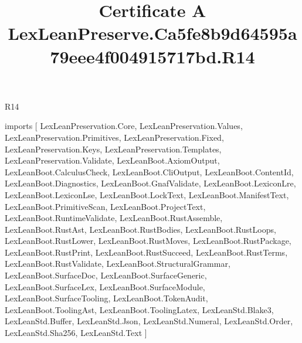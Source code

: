 \begin{lexlean}{R14}
\title{Certificate A LexLeanPreserve.Ca5fe8b9d64595a79eee4f004915717bd.R14}
\begin{coremodule}
imports [
  LexLeanPreservation.Core,
  LexLeanPreservation.Values,
  LexLeanPreservation.Primitives,
  LexLeanPreservation.Fixed,
  LexLeanPreservation.Keys,
  LexLeanPreservation.Templates,
  LexLeanPreservation.Validate,
  LexLeanBoot.AxiomOutput,
  LexLeanBoot.CalculusCheck,
  LexLeanBoot.CliOutput,
  LexLeanBoot.ContentId,
  LexLeanBoot.Diagnostics,
  LexLeanBoot.GnafValidate,
  LexLeanBoot.LexiconLre,
  LexLeanBoot.LexiconLse,
  LexLeanBoot.LockText,
  LexLeanBoot.ManifestText,
  LexLeanBoot.PrimitiveScan,
  LexLeanBoot.ProjectText,
  LexLeanBoot.RuntimeValidate,
  LexLeanBoot.RustAssemble,
  LexLeanBoot.RustAst,
  LexLeanBoot.RustBodies,
  LexLeanBoot.RustLoops,
  LexLeanBoot.RustLower,
  LexLeanBoot.RustMoves,
  LexLeanBoot.RustPackage,
  LexLeanBoot.RustPrint,
  LexLeanBoot.RustSucceed,
  LexLeanBoot.RustTerms,
  LexLeanBoot.RustValidate,
  LexLeanBoot.StructuralGrammar,
  LexLeanBoot.SurfaceDoc,
  LexLeanBoot.SurfaceGeneric,
  LexLeanBoot.SurfaceLex,
  LexLeanBoot.SurfaceModule,
  LexLeanBoot.SurfaceTooling,
  LexLeanBoot.TokenAudit,
  LexLeanBoot.ToolingAst,
  LexLeanBoot.ToolingLatex,
  LexLeanStd.Blake3,
  LexLeanStd.Buffer,
  LexLeanStd.Json,
  LexLeanStd.Numeral,
  LexLeanStd.Order,
  LexLeanStd.Sha256,
  LexLeanStd.Text
]


\end{coremodule}
\end{lexlean}
